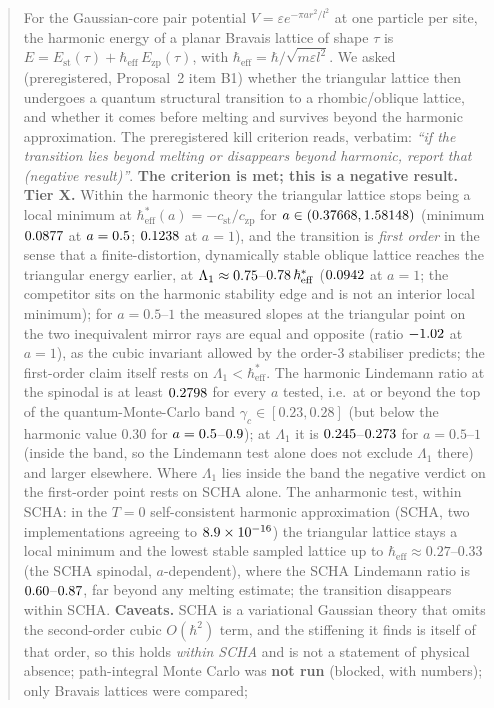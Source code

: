 \documentclass[10pt]{article}
\newcommand{\hb}{\hbar_{\mathrm{eff}}}
\newcommand{\Ezp}{E_{\mathrm{zp}}}
\newcommand{\Est}{E_{\mathrm{st}}}
\begin{document}
\begin{abstract}
For the Gaussian-core pair potential $V=\varepsilon e^{-\pi a r^2/l^2}$ at one particle per site, the harmonic energy of a planar Bravais lattice of
shape $\tau$ is $E=\Est(\tau)+\hb\,\Ezp(\tau)$, with $\hb=\hbar/\sqrt{m\varepsilon l^2}$. We asked (preregistered, Proposal~2 item B1) whether
the triangular lattice then undergoes a quantum structural transition to a rhombic/oblique lattice, and whether it comes before melting and survives beyond the
harmonic approximation. The preregistered kill criterion reads, verbatim: \emph{``if the transition lies beyond melting or disappears beyond harmonic,
report that (negative result)''}. \textbf{The criterion is met; this is a negative result.}
\textbf{Tier X.} Within the harmonic theory the triangular lattice stops being a local minimum at $\hb^*(a)=-c_{\mathrm{st}}/c_{\mathrm{zp}}$ for $a\in(\RootOne,\RootTwo)$
(minimum $\BAMinHbar$ at $a=\BAMinHbarA$; $\BAHbarOne$ at $a=1$), and the transition is \emph{first order} in the sense that a finite-distortion, dynamically stable oblique lattice reaches the triangular energy
earlier, at $\Lambda_1\approx\BARatioLo$--$\BARatioHi\,\hb^*$ ($\BALamOne$ at $a=1$; the competitor sits on the harmonic stability edge and is not an interior local minimum); for $a=0.5$--$1$ the measured slopes at the triangular point on the two inequivalent mirror rays are equal and opposite (ratio $\RayRatioOne$ at $a=1$), as the cubic invariant allowed by the order-3 stabiliser predicts; the first-order claim itself rests on $\Lambda_1<\hb^*$. The harmonic Lindemann ratio at the spinodal is at least $\BBMinGammaStar$ for every $a$ tested,
i.e.\ at or beyond the top of the quantum-Monte-Carlo band $\gamma_c\in[0.23,0.28]$ (but below the harmonic value $0.30$ for $a=\BCBelowALo$--$\BCBelowAHi$); at $\Lambda_1$ it is $\BBMinGammaLam$--$\BAGammaLamOne$ for $a=0.5$--$1$ (inside the band, so the Lindemann test alone
does not exclude $\Lambda_1$ there) and larger elsewhere. Where $\Lambda_1$ lies inside the band the negative verdict on the first-order point rests on SCHA alone. The anharmonic test, within SCHA: in the $T=0$ self-consistent harmonic approximation (SCHA, two implementations agreeing to $\CrossMax$) the triangular
lattice stays a local minimum and the lowest stable sampled lattice up to $\hb\approx0.27$--$0.33$ (the SCHA spinodal, $a$-dependent), where the SCHA Lindemann ratio is $\SchaGammaLowAll$--$\SchaGammaFirstBelowOne$, far beyond any melting estimate; the transition disappears within SCHA.
\textbf{Caveats.} SCHA is a variational Gaussian theory that omits the second-order cubic $O(\hbar^2)$ term, and the stiffening it finds is itself of that order, so this holds \emph{within SCHA} and is not a statement of physical absence; path-integral Monte Carlo was \textbf{not run} (blocked, with numbers); only Bravais lattices were compared;

\end{abstract}
\end{document}

